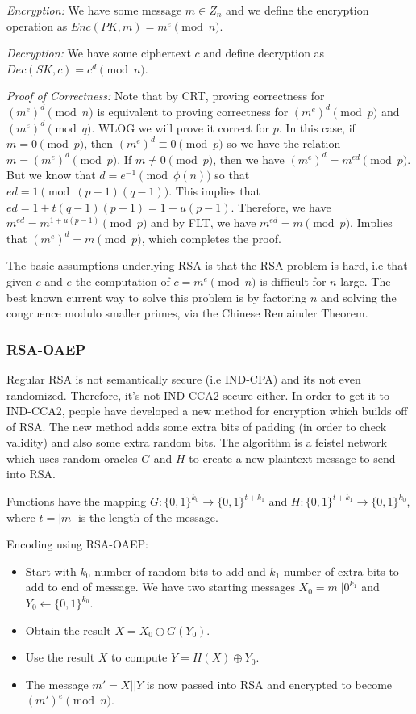 \documentclass[psamsfonts]{amsart}
\begin{document}
\emph{Encryption:} We have some message $m \in Z_n$ and we define the encryption operation as $Enc(PK, m) = m^e \pmod{n}$.

\emph{Decryption:} We have some ciphertext $c$ and define decryption as $Dec(SK, c) = c^d \pmod{n}$.

\emph{Proof of Correctness:} Note that by CRT, proving correctness for $(m^e)^d \pmod{n}$ is equivalent to proving correctness for $(m^e)^d \pmod{p}$ and $(m^e)^d \pmod{q}$. WLOG we will prove it correct for $p$. In this case, if $m = 0 \pmod{p}$, then $(m^e)^d \equiv 0 \pmod{p}$ so we have the relation $m = (m^e)^d \pmod{p}$. If $m \neq 0 \pmod{p}$, then we have $(m^e)^d = m^{ed} \pmod{p}$. But we know that $d = e^{-1} \pmod{\phi(n)}$ so that $ed = 1 \pmod{(p-1)(q-1)}$. This implies that $ed = 1 + t(q-1)(p-1) = 1 + u(p-1)$. Therefore, we have $m^{ed} = m^{1+u(p-1)} \pmod{p}$ and by FLT, we have $m^{ed} = m \pmod{p}$. Implies that $(m^e)^d = m \pmod{p}$, which completes the proof.

The basic assumptions underlying RSA is that the RSA problem is hard, i.e that given $c$ and $e$ the computation of $c = m^e \pmod{n}$ is difficult for $n$ large. The best known current way to solve this problem is by factoring $n$ and solving the congruence modulo smaller primes, via the Chinese Remainder Theorem.

\subsubsection{RSA-OAEP}

Regular RSA is not semantically secure (i.e IND-CPA) and its not even randomized. Therefore, it's not IND-CCA2 secure either. In order to get it to IND-CCA2, people have developed a new method for encryption which builds off of RSA. The new method adds some extra bits of padding (in order to check validity) and also some extra random bits. The algorithm is a feistel network which uses random oracles $G$ and $H$ to create a new plaintext message to send into RSA.

Functions have the mapping $G: \{0,1\}^{k_0} \to \{0,1\}^{t + k_1}$ and $H: \{0,1\}^{t + k_1} \to \{0,1\}^{k_0}$, where $t = |m|$ is the length of the message.

Encoding using RSA-OAEP:
\begin{itemize}
  \item Start with $k_0$ number of random bits to add and $k_1$ number of extra bits to add to end of message. We have two starting messages $X_0 = m || 0^{k_1}$ and $Y_0 \leftarrow \{0,1\}^{k_0}$.
  \item Obtain the result $X = X_0 \oplus G(Y_0)$.
  \item Use the result $X$ to compute $Y = H(X) \oplus Y_0$.
  \item The message $m' = X || Y$ is now passed into RSA and encrypted to become $(m')^e \pmod{n}$.
\end{itemize}
\end{document}
